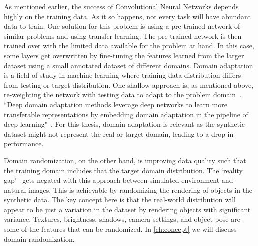 As mentioned earlier, the success of Convolutional Neural Networks depends highly on the training data.
As it so happens, not every task will have abundant data to train.
One solution for this problem is using a pre-trained network of similar problems and using transfer learning.
The pre-trained network is then trained over with the limited data available for the problem at hand.
In this case, some layers get overwritten by fine-tuning the features learned from the larger dataset using a small annotated dataset of different domains.
Domain adaptation is a field of study in machine learning where training data distribution differs from testing or target distribution.
One shallow approach is, as mentioned above,
re-weighting the network with testing data to adapt to the problem domain~\cite{Li2017PredictionRF}.
``Deep domain adaptation methods leverage deep networks to learn more transferable representations by embedding domain adaptation in the pipeline of
deep learning"~\cite{Wang2018}.
For this thesis, domain adaptation is relevant as the synthetic dataset might not represent the real or target domain, leading to a drop in performance.

Domain randomization, on the other hand, is improving data quality such that the training domain includes that the target domain distribution.
The `reality gap'~\cite{tobin2017domain} gets negated with this approach between simulated environment and natural images.
This is achievable by randomizing the rendering of objects in the synthetic data.
The key concept here is that the real-world distribution will appear to be just a variation in the dataset by rendering objects with significant variance.
Textures, brightness, shadows, camera settings, and object pose are some of the features that can be randomized.
In \autoref{ch:concept} we will discuss domain randomization.



